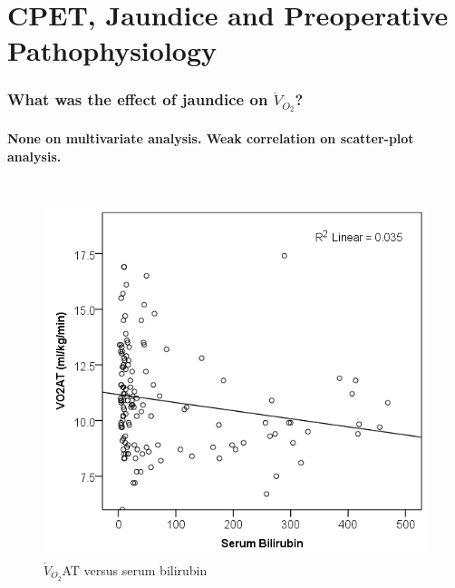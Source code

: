 \documentclass[10pt]{beamer}
\begin{document}
\section[Chapter 3]{CPET, Jaundice and Preoperative Pathophysiology}

\begin{frame}
	\frametitle{What was the effect of jaundice on $\dot{V}_{O_2}$?}
	\framesubtitle{None on multivariate analysis. Weak correlation on scatter-plot analysis.}
	\begin{columns}[t]
		\begin{figure}
			\includegraphics[width=\textwidth]{../Figures/cpet_oj_scatter_at_bil}
			\\ $\dot{V}_{O_2}$AT versus serum bilirubin
		\end{figure}
		

\end{columns}
\end{frame}
\end{document}
